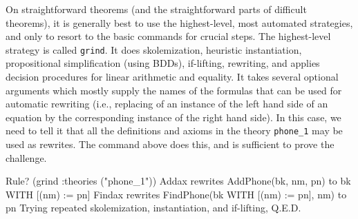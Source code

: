 On straightforward theorems (and the straightforward parts of
difficult theorems), it is generally best to use the highest-level,
most automated strategies, and only to resort to the basic commands
for crucial steps.  The highest-level strategy is called {\tt grind}.
It does skolemization, heuristic instantiation, propositional
simplification (using BDDs), if-lifting, rewriting, and applies
decision procedures for linear arithmetic and equality.  It takes
several optional arguments which mostly supply the names of the
formulas that can be used for automatic rewriting (i.e., replacing of
an instance of the left hand side of an equation by the corresponding
instance of the right hand side).  In this case, we need to tell it
that all the definitions and axioms in the theory {\tt phone\_1} may
be used as rewrites.  The command above does this, and is sufficient
to prove the challenge.
\begin{jmrsession}
Rule? (grind :theories ("phone_1"))
Addax rewrites AddPhone(bk, nm, pn)
  to bk WITH [(nm) := pn]
Findax rewrites FindPhone(bk WITH [(nm) := pn], nm)
  to pn
Trying repeated skolemization, instantiation, and if-lifting,
Q.E.D.
\end{jmrsession}

